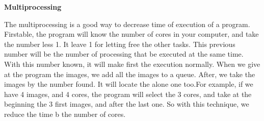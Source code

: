 \textbf{Multiprocessing}

The multiprocessing is a good way to decrease time of execution of a program. Firstable, the program will know the number of cores in your computer, and take the number less 1. It leave 1 for letting free the other tasks.
This previous number will be the number of processing that be executed at the same time. With this number known, it will make first the execution normally. When we give at the program the images, we add all the images to a queue. After, we take the images by the number found. It will locate the alone one too.For example, if we have 4 images, and 4 cores, the program will select the 3 cores, and take at the beginning the 3 first images, and after the last one.
So with this technique, we reduce the time b the number of cores.
  
  